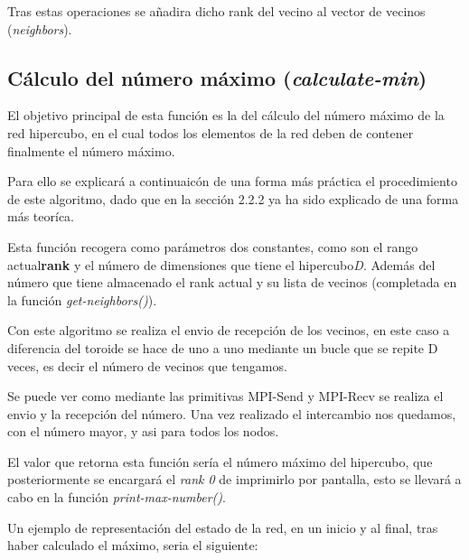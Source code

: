 \documentclass[11pt]{article}
\begin{document}
Tras estas operaciones se añadira dicho rank del vecino al vector de vecinos (\textit{neighbors}).

\subsection{Cálculo del número máximo (\textit{calculate-min})}
El objetivo principal de esta función es la del cálculo del número máximo de la red hipercubo, en el cual todos los elementos de la red deben de contener finalmente el número máximo.

Para ello se explicará a continuaicón de una forma más práctica el procedimiento de este algoritmo, dado que en la sección 2.2.2 ya ha sido explicado de una forma más teoríca.

Esta función recogera como parámetros dos constantes, como son el rango actual\textbf{rank} y el número de dimensiones que tiene el hipercubo\textit{D}. Además del número que tiene almacenado el rank actual y su lista de vecinos (completada en la función \textit{get-neighbors()}). 




Con este algoritmo se realiza el envio de recepción de los vecinos, en este caso a diferencia del toroide se hace de uno a uno mediante un bucle que se repite D veces, es decir el número de vecinos que tengamos.

Se puede ver como mediante las primitivas MPI-Send y MPI-Recv se realiza el envio y la recepción del número.
Una vez realizado el intercambio nos quedamos, con el número mayor, y asi para todos los nodos.

El valor que retorna esta función sería el número máximo del hipercubo, que posteriormente se encargará el \textit{rank 0} de imprimirlo por pantalla, esto se llevará a cabo en la función \textit{print-max-number()}.
\clearpage

Un ejemplo de representación del estado de la red, en un inicio y al final, tras haber calculado el máximo, seria el siguiente:
\end{document}
